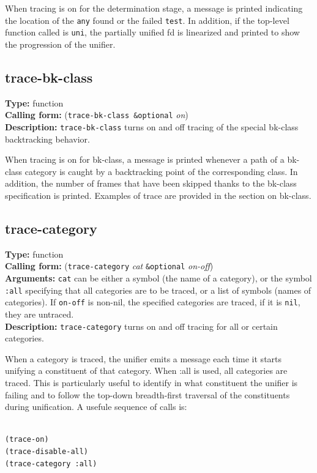 \documentclass[10pt,a4paper]{report}
\begin{document}
When tracing is on for the determination stage, a message is printed
indicating the location of the {\tt any} found or the failed {\tt test}.  In
addition, if the top-level function called is {\tt uni}, the partially
unified fd is linearized and printed to show the progression of the
unifier. 


\subsection{trace-bk-class}
{\bf Type:} function
\\{\bf Calling form:} ({\tt trace-bk-class \&optional} {\em on})
\\{\bf Description:} {\tt trace-bk-class} turns on and off tracing of the
special bk-class backtracking behavior.

When tracing is on for bk-class, a message is printed whenever a path of a
bk-class category is caught by a backtracking point of the corresponding
class. In addition, the number of frames that have been skipped thanks to
the bk-class specification is printed.  Examples of trace are provided in
the section on bk-class.


\subsection{trace-category}
{\bf Type:} function
\\{\bf Calling form:} ({\tt trace-category} {\em cat} {\tt \&optional} {\em on-off})
\\{\bf Arguments:} {\tt cat} can be either a symbol (the name of a category),
or the symbol {\tt :all} specifying that all categories are to be traced, or
a list of symbols (names of categories).  If {\tt on-off} is non-nil, the
specified categories are traced, if it is {\tt nil}, they are untraced.
\\{\bf Description:} {\tt trace-category} turns on and off tracing for
all or certain categories.

When a category is traced, the unifier emits a message each time it starts
unifying a constituent of that category.  When :all is used, all categories
are traced.  This is particularly useful to identify in what constituent
the unifier is failing and to follow the top-down breadth-first traversal
of the constituents during unification.  A usefule sequence of calls is:

\begin{lstlisting}[language=Lisp]

(trace-on)
(trace-disable-all)
(trace-category :all)

\end{lstlisting}
\end{document}
